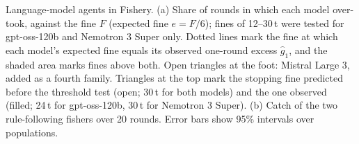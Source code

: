 Language-model agents in Fishery. (a) Share of rounds in which each model over-took, against the fine $F$ (expected fine $e=F/6$); fines of 12--30\,t were tested for gpt-oss-120b and Nemotron 3 Super only. Dotted lines mark the fine at which each model's expected fine equals its observed one-round excess $\hat g_1$, and the shaded area marks fines above both. Open triangles at the foot: Mistral Large 3, added as a fourth family. Triangles at the top mark the stopping fine predicted before the threshold test (open; 30\,t for both models) and the one observed (filled; 24\,t for gpt-oss-120b, 30\,t for Nemotron 3 Super). (b) Catch of the two rule-following fishers over 20 rounds. Error bars show 95\% intervals over populations.
